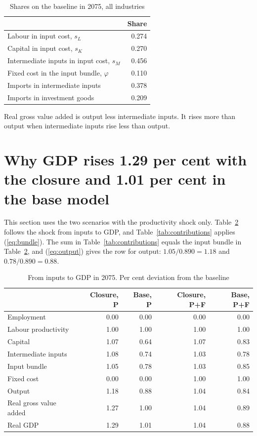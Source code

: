 \documentclass[11pt,a4paper]{article}
\begin{document}
\begin{table}[H]
\centering
\small
\caption{Shares on the baseline in 2075, all industries}
\label{tab:baseline}
\begin{tabular}{@{}lr@{}}
\toprule
 & Share \\
\midrule
Labour in input cost, $s_L$ & 0.274 \\
Capital in input cost, $s_K$ & 0.270 \\
Intermediate inputs in input cost, $s_M$ & 0.456 \\
Fixed cost in the input bundle, $\varphi$ & 0.110 \\
Imports in intermediate inputs & 0.378 \\
Imports in investment goods & 0.209 \\
\bottomrule
\end{tabular}
\end{table}

Real gross value added is output less intermediate inputs. It rises more than output when intermediate inputs rise less than output.

\section{Why GDP rises 1.29 per cent with the closure and 1.01 per cent in the base model}
\label{sec:why}

This section uses the two scenarios with the productivity shock only.
Table~\ref{tab:inputs} follows the shock from inputs to GDP, and Table~\ref{tab:contributions} applies (\ref{eq:bundle}).
The sum in Table~\ref{tab:contributions} equals the input bundle in Table~\ref{tab:inputs}, and (\ref{eq:output}) gives the row for output: $1.05 / 0.890 = 1.18$ and $0.78 / 0.890 = 0.88$.

\begin{table}[H]
\centering
\small
\caption{From inputs to GDP in 2075. Per cent deviation from the baseline}
\label{tab:inputs}
\begin{tabular}{@{}lrrrr@{}}
\toprule
 & Closure, P & Base, P & Closure, P+F & Base, P+F \\
\midrule
Employment & 0.00 & 0.00 & 0.00 & 0.00 \\
Labour productivity & 1.00 & 1.00 & 1.00 & 1.00 \\
Capital & 1.07 & 0.64 & 1.07 & 0.83 \\
Intermediate inputs & 1.08 & 0.74 & 1.03 & 0.78 \\
\midrule
Input bundle & 1.05 & 0.78 & 1.03 & 0.85 \\
Fixed cost & 0.00 & 0.00 & 1.00 & 1.00 \\
Output & 1.18 & 0.88 & 1.04 & 0.84 \\
\midrule
Real gross value added & 1.27 & 1.00 & 1.04 & 0.89 \\
Real GDP & 1.29 & 1.01 & 1.04 & 0.88 \\
\bottomrule
\end{tabular}
\end{table}
\end{document}
